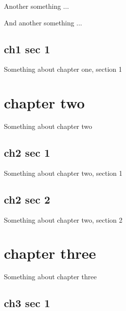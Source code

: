 \documentclass[12pt, a4paper]{report}
\begin{document}
Another something ...

And another something ...

\section{ch1 sec 1}

Something about chapter one, section 1

\chapter{chapter two}

Something about chapter two

\section{ch2 sec 1}

Something about chapter two, section 1

\section{ch2 sec 2}

Something about chapter two, section 2

\chapter{chapter three}

Something about chapter three

\section{ch3 sec 1}
\end{document}
